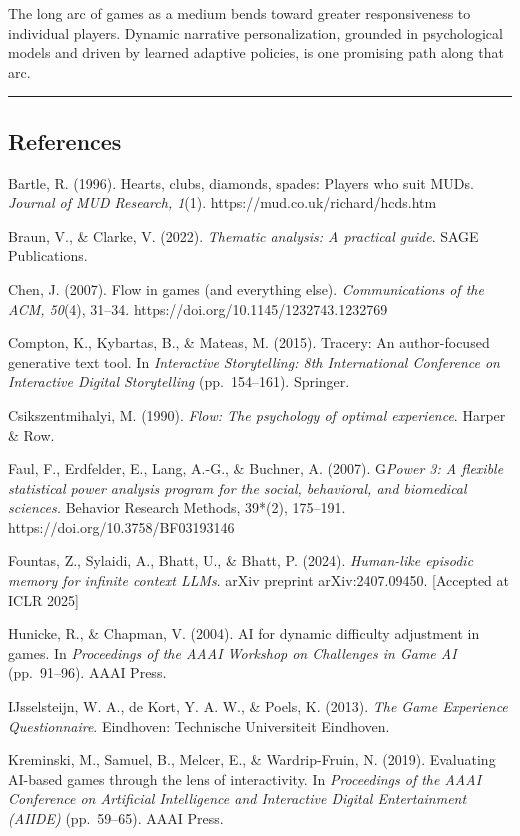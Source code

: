 The long arc of games as a medium bends toward greater responsiveness to
individual players. Dynamic narrative personalization, grounded in
psychological models and driven by learned adaptive policies, is one
promising path along that arc.

\begin{center}\rule{0.5\linewidth}{0.5pt}\end{center}

\subsection{References}\label{references}

Bartle, R. (1996). Hearts, clubs, diamonds, spades: Players who suit
MUDs. \emph{Journal of MUD Research, 1}(1).
https://mud.co.uk/richard/hcds.htm

Braun, V., \& Clarke, V. (2022). \emph{Thematic analysis: A practical
guide}. SAGE Publications.

Chen, J. (2007). Flow in games (and everything else).
\emph{Communications of the ACM, 50}(4), 31--34.
https://doi.org/10.1145/1232743.1232769

Compton, K., Kybartas, B., \& Mateas, M. (2015). Tracery: An
author-focused generative text tool. In \emph{Interactive Storytelling:
8th International Conference on Interactive Digital Storytelling}
(pp.~154--161). Springer.

Csikszentmihalyi, M. (1990). \emph{Flow: The psychology of optimal
experience}. Harper \& Row.

Faul, F., Erdfelder, E., Lang, A.-G., \& Buchner, A. (2007).
G\emph{Power 3: A flexible statistical power analysis program for the
social, behavioral, and biomedical sciences. }Behavior Research Methods,
39*(2), 175--191. https://doi.org/10.3758/BF03193146

Fountas, Z., Sylaidi, A., Bhatt, U., \& Bhatt, P. (2024).
\emph{Human-like episodic memory for infinite context LLMs}. arXiv
preprint arXiv:2407.09450. {[}Accepted at ICLR 2025{]}

Hunicke, R., \& Chapman, V. (2004). AI for dynamic difficulty adjustment
in games. In \emph{Proceedings of the AAAI Workshop on Challenges in
Game AI} (pp.~91--96). AAAI Press.

IJsselsteijn, W. A., de Kort, Y. A. W., \& Poels, K. (2013). \emph{The
Game Experience Questionnaire}. Eindhoven: Technische Universiteit
Eindhoven.

Kreminski, M., Samuel, B., Melcer, E., \& Wardrip-Fruin, N. (2019).
Evaluating AI-based games through the lens of interactivity. In
\emph{Proceedings of the AAAI Conference on Artificial Intelligence and
Interactive Digital Entertainment (AIIDE)} (pp.~59--65). AAAI Press.

